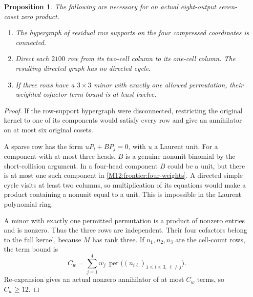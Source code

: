\documentclass[11pt,a4paper,oneside]{report}
\newtheorem{proposition}[theorem]{Proposition}
\theoremstyle{definition}
\theoremstyle{remark}
\begin{document}
\begin{proposition}\label{M12:frontier:filters}
The following are necessary for an actual eight-output seven-coset
zero product.
\begin{enumerate}
\item The hypergraph of residual row supports on the four compressed
coordinates is connected.
\item Direct each $2100$ row from its two-cell column to its one-cell
column. The resulting directed graph has no directed cycle.
\item If three rows have a $3\times3$ minor with exactly one allowed
permutation, their weighted cofactor term bound is at least twelve.
\end{enumerate}
\end{proposition}
\begin{proof}
If the row-support hypergraph were disconnected, restricting the
original kernel to one of its components would satisfy every row
and give an annihilator on at most six original cosets.

A sparse row has the form $uP_i+BP_j=0$, with $u$ a Laurent unit.
For a component with at most three heads, $B$ is a genuine nonunit
binomial by the short-collision argument. In a four-head component
$B$ could be a unit, but there is at most one such component in
\eqref{M12:frontier:four-weights}. A directed simple cycle visits at
least two columns, so multiplication of its equations would make
a product containing a nonunit equal to a unit. This is impossible
in the Laurent polynomial ring.

A minor with exactly one permitted permutation is a product of
nonzero entries and is nonzero. Thus the three rows are independent.
Their four cofactors belong to the full kernel, because $M$ has
rank three. If $n_1,n_2,n_3$ are the cell-count rows, the term bound is
\begin{equation}\label{M12:frontier:weighted-permanent}
 C_w=\sum_{j=1}^4w_j\,\operatorname{per}
       \bigl((n_{i\ell})_{1\le i\le3,\,\ell\ne j}\bigr).
\end{equation}
Re-expansion gives an actual nonzero annihilator of at most $C_w$
terms, so $C_w\ge12$.
\end{proof}
\end{document}
